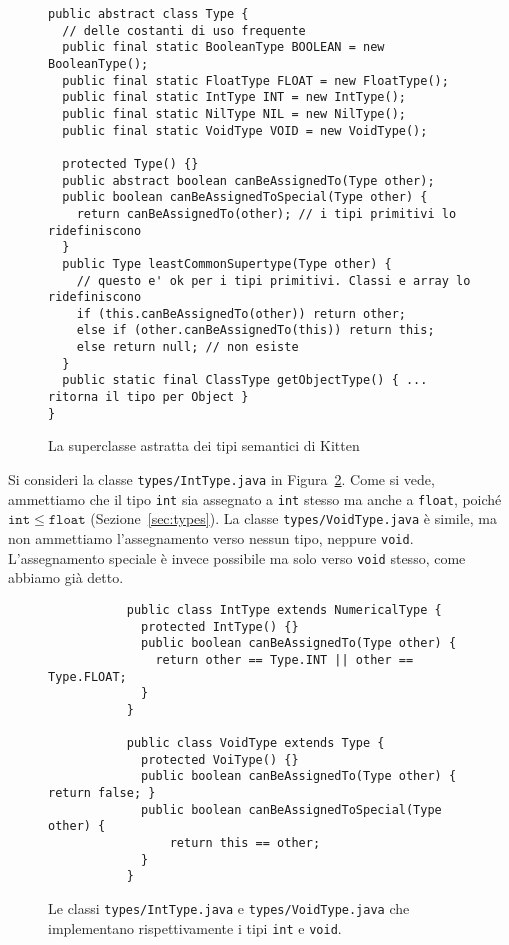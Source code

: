 \begin{figure}[t]
{\small
\begin{verbatim}
public abstract class Type {
  // delle costanti di uso frequente
  public final static BooleanType BOOLEAN = new BooleanType();
  public final static FloatType FLOAT = new FloatType();
  public final static IntType INT = new IntType();
  public final static NilType NIL = new NilType();
  public final static VoidType VOID = new VoidType();

  protected Type() {}
  public abstract boolean canBeAssignedTo(Type other);
  public boolean canBeAssignedToSpecial(Type other) {
    return canBeAssignedTo(other); // i tipi primitivi lo ridefiniscono
  }
  public Type leastCommonSupertype(Type other) {
    // questo e' ok per i tipi primitivi. Classi e array lo ridefiniscono
    if (this.canBeAssignedTo(other)) return other;
    else if (other.canBeAssignedTo(this)) return this;
    else return null; // non esiste
  }
  public static final ClassType getObjectType() { ... ritorna il tipo per Object }
}
\end{verbatim}
}
\caption{La superclasse astratta dei tipi semantici di Kitten}
  \label{fig:types.Type}
\end{figure}

Si consideri la classe \texttt{types/IntType.java}
in Figura~\ref{fig:types.IntVoidType}.
Come si vede, ammettiamo che il tipo \texttt{int} sia assegnato a
\texttt{int} stesso ma anche a \texttt{float}, poich\'e
$\mathtt{int}\le\mathtt{float}$ (Sezione~\ref{sec:types}).
La classe \texttt{types/VoidType.java} \`e simile, ma non ammettiamo
l'assegnamento verso nessun tipo, neppure \texttt{void}.
L'assegnamento speciale \`e invece possibile ma solo verso \texttt{void}
stesso, come abbiamo gi\`a detto.
%
\begin{figure}
{\small
\begin{verbatim}
           public class IntType extends NumericalType {
             protected IntType() {}
             public boolean canBeAssignedTo(Type other) {
               return other == Type.INT || other == Type.FLOAT;
             }
           }

           public class VoidType extends Type {
             protected VoiType() {}
             public boolean canBeAssignedTo(Type other) { return false; }
             public boolean canBeAssignedToSpecial(Type other) {
                 return this == other;
             }
           }
\end{verbatim}}
\caption{Le classi \texttt{types/IntType.java} e
         \texttt{types/VoidType.java} che implementano rispettivamente i tipi
         \texttt{int} e \texttt{void}.}
  \label{fig:types.IntVoidType}
\end{figure}

